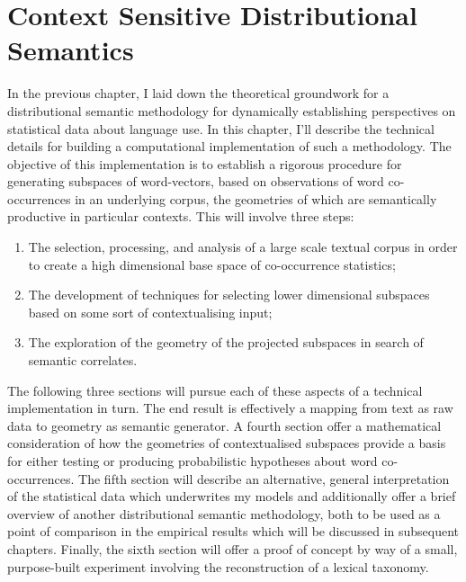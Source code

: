 \chapter{Context Sensitive Distributional Semantics} \label{chap:method}
In the previous chapter, I laid down the theoretical groundwork for a distributional semantic methodology for dynamically establishing perspectives on statistical data about language use.  In this chapter, I'll describe the technical details for building a computational implementation of such a methodology.  The objective of this implementation is to establish a rigorous procedure for generating subspaces of word-vectors, based on observations of word co-occurrences in an underlying corpus, the geometries of which are semantically productive in particular contexts.  This will involve three steps:

\begin{enumerate}
\item The selection, processing, and analysis of a large scale textual corpus in order to create a high dimensional base space of co-occurrence statistics;
\item The development of techniques for selecting lower dimensional subspaces based on some sort of contextualising input;
\item The exploration of the geometry of the projected subspaces in search of semantic correlates.
\end{enumerate}

The following three sections will pursue each of these aspects of a technical implementation in turn.  The end result is effectively a mapping from text as raw data to geometry as semantic generator.  A fourth section offer a mathematical consideration of how the geometries of contextualised subspaces provide a basis for either testing or producing probabilistic hypotheses about word co-occurrences.  The fifth section will describe an alternative, general interpretation of the statistical data which underwrites my models and additionally offer a brief overview of another distributional semantic methodology, both to be used as a point of comparison in the empirical results which will be discussed in subsequent chapters.  Finally, the sixth section will offer a proof of concept by way of a small, purpose-built experiment involving the reconstruction of a lexical taxonomy.

